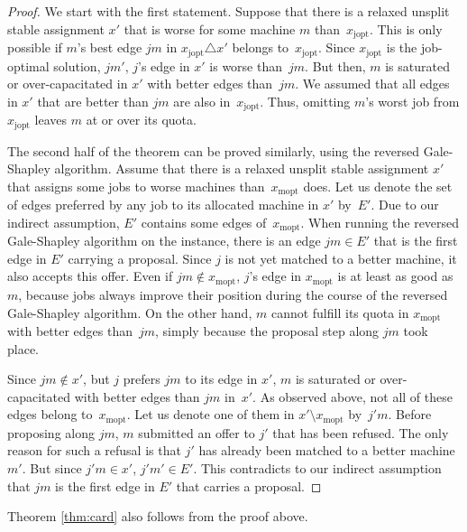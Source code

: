 \documentclass{llncs}
\begin{document}
\begin{proof}

We start with the first statement. Suppose that there is a relaxed
unsplit stable assignment $x'$ that is worse for some machine $m$
than~$x_{\text{jopt}}$.  This is only possible if $m$'s best edge $jm$
in $x_{\text{jopt}} \triangle x'$ belongs to~$x_{\text{jopt}}$. Since
$x_{\text{jopt}}$ is the job-optimal solution, $jm'$, $j$'s edge in
$x'$ is worse than~$jm$. But then, $m$ is saturated or
over-capacitated in $x'$ with better edges than~$jm$. We assumed that
all edges in $x'$ that are better than $jm$ are also
in~$x_{\text{jopt}}$. Thus, omitting $m$'s worst job from
$x_{\text{jopt}}$ leaves $m$ at or over its quota.

The second half of the theorem can be proved similarly, using the
reversed Gale-Shapley algorithm. Assume that there is a relaxed
unsplit stable assignment $x'$ that assigns some jobs to worse
machines than~$x_{\text{mopt}}$ does. Let us denote the set of edges
preferred by any job to its allocated machine in $x'$ by~$E'$. Due to
our indirect assumption, $E'$ contains some edges
of~$x_{\text{mopt}}$. When running the reversed Gale-Shapley algorithm
on the instance, there is an edge $jm \in E'$ that is the first edge
in $E'$ carrying a proposal. Since $j$ is not yet matched to a better
machine, it also accepts this offer. Even if $jm \notin
x_{\text{mopt}}$, $j$'s edge in $x_{\text{mopt}}$ is at least as good
as~$m$, because jobs always improve their position during the course
of the reversed Gale-Shapley algorithm. On the other hand, $m$ cannot
fulfill its quota in $x_{\text{mopt}}$ with better edges than~$jm$,
simply because the proposal step along $jm$ took place.

Since $jm \notin x'$, but $j$ prefers $jm$ to its edge in $x'$, $m$ is
saturated or over-capacitated with better edges than $jm$ in~$x'$. As
observed above, not all of these edges belong
to~$x_{\text{mopt}}$. Let us denote one of them in $x' \setminus
x_{\text{mopt}}$ by~$j'm$. Before proposing along $jm$, $m$ submitted
an offer to $j'$ that has been refused. The only reason for such a
refusal is that $j'$ has already been matched to a better
machine~$m'$. But since $j'm \in x'$, $j'm' \in E'$. This contradicts
to our indirect assumption that $jm$ is the first edge in $E'$ that
carries a proposal. \end{proof}

Theorem \ref{thm:card} also follows from the proof above.  
\end{document}

